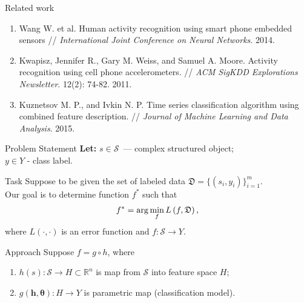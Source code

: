 \documentclass{beamer}
\begin{document}
\begin{frame}{Related work}
	\begin{enumerate}
		\item Wang W. et al. Human activity recognition using smart phone embedded sensors // \emph{International Joint Conference on Neural Networks}. 2014.
		\vfill
		\item Kwapisz, Jennifer R., Gary M. Weiss, and Samuel A. Moore. Activity recognition using cell phone accelerometers. // \emph{ACM SigKDD Explorations Newsletter}. 12(2): 74-82. 2011.
		\vfill
		\item Kuznetsov M. P., and Ivkin N. P. Time series classification algorithm using combined feature description. // \emph{Journal of Machine Learning and Data Analysis}. 2015.
	\end{enumerate}
	
\end{frame}
\begin{frame}{Problem Statement}
	\textbf{Let:} $s \in \mathcal{S}$~--- complex structured object;\\
	\hspace{24pt}$y \in Y$ - class label.
	\vfill
	\begin{block}{Task}
	Suppose to be given the set of labeled data $\mathfrak{D} = \{(s_i, y_i)\}_{i=1}^m$. \\Our goal is to determine function $f^*$ such that \vspace{-0.2cm}$$f^* = \arg \min_f L\left(f, \mathfrak{D}\right),\vspace{-0.3cm}$$ where $L(\cdot, \cdot)$ is an error function and $f: \mathcal{S} \rightarrow Y$.
	\end{block}
	\vfill
	\begin{block}{Approach}
		Suppose $f = g \circ h$, where
		\begin{enumerate}
			\item $h(s): \mathcal{S} \rightarrow H \subset \mathbb{R}^n$ is map from $\mathcal{S}$ into feature space $H$;
			\item $g(\bm{h}, \bm\theta): H \rightarrow Y$ is parametric map (classification model).
		\end{enumerate}
	\end{block}
\end{frame}
\end{document}

